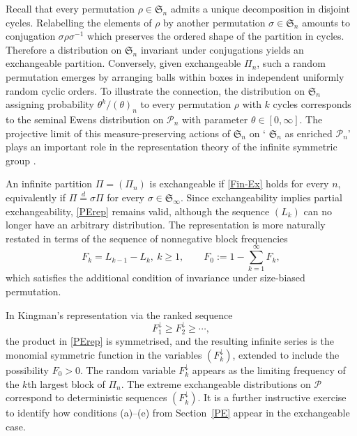\documentclass{article}
\begin{document}
Recall that every permutation $\rho\in{\mathfrak S}_n$  admits a unique decomposition in disjoint cycles.
Relabelling the elements of $\rho$ by another permutation $\sigma\in{\mathfrak S}_n$ amounts to conjugation $\sigma\rho\sigma^{-1}$ which preserves the ordered shape 
of the partition in cycles. Therefore a distribution on ${\mathfrak S}_n$ invariant under conjugations yields an exchangeable partition. Conversely, given exchangeable $\Pi_n$,
such a random permutation emerges by arranging balls within boxes in independent uniformly random cyclic orders.
To illustrate the connection, the distribution on ${\mathfrak S}_n$ assigning probability $\theta^{k}/(\theta)_n$ to every permutation $\rho$ with $k$ cycles corresponds to the 
seminal Ewens distribution on ${\mathcal P}_n$ with parameter $\theta\in[0,\infty]$.
The projective limit of this measure-preserving actions of $\mathfrak S_n$ on  ` $\mathfrak S_n$ as enriched $\mathcal P_n$'  plays an important role 
in the representation theory of the  infinite symmetric group \cite{BO}.







An infinite partition $\Pi=(\Pi_n)$ is exchangeable if \eqref{Fin-Ex} holds
for every $n$, equivalently if
$\Pi\stackrel{d}{=}\sigma\Pi$ for every $\sigma\in{\mathfrak S}_\infty$.
Since exchangeability implies partial exchangeability,
\eqref{PErep} remains valid, although the sequence $(L_k)$ can no longer have
an arbitrary distribution.
The representation is more naturally restated in terms of the sequence of  nonnegative block
frequencies
\[
F_k=L_{k-1}-L_k, ~k\geq 1,\qquad F_0:=1-\sum_{k=1}^\infty F_k,
\]
which satisfies the additional condition of invariance under size-biased
permutation.



In Kingman's representation via
 the ranked sequence 
\[
F_1^\downarrow\ge F_2^\downarrow\ge\cdots,
\]
the product in \eqref{PErep} is symmetrised, and
the resulting 
 infinite series is the monomial symmetric function  in the variables
$(F_k^\downarrow)$,
extended to include the possibility $F_0>0$.
The random variable $F_k^\downarrow$ appears as the limiting frequency of the
$k$th largest block of $\Pi_n$.
The extreme exchangeable distributions on ${\mathcal P}$ correspond to
deterministic sequences $(F_k^\downarrow)$.
It is a further instructive exercise to identify how conditions
(a)--(e) from Section~\ref{PE} appear in the exchangeable case.
\end{document}
